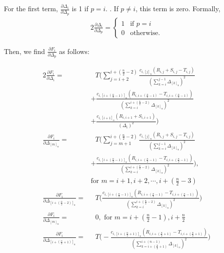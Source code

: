 For the first term, $\frac{\partial\Delta_{i}}{\partial \Delta_p}$ is 1 if $p = i$. . If $p \neq i$, this term is zero. Formally,
\begin{alignat}{2}
\frac{\partial\Delta_{i}}{\partial \Delta_p} = \begin{cases}1 & \text{if }p = i \\ 0 & \text{otherwise.}\end{cases}
\label{eq:diffdelta}
\end{alignat}

Then, we find $\frac{\partial F_i}{\partial \Delta_p}$ as follows:

\begin{alignat}{2}
\frac{\partial F_i}{\partial \Delta_i} =& \text{ }T \Bigg( \sum_{j= i + 2}^{i+(\frac{n}{2}-2)}  \frac{c_{i,[j]_n}(R_{i,j} + S_{i,j} - T_{i,j})}{(\sum_{k=i}^{j-1}\Delta_{[k]_n})^2} \nonumber \\
    &+ \frac{c_{i,[i+(\frac{n}{2}-1)]_n}(R_{i,i+(\frac{n}{2}-1)} - T_{i,i+(\frac{n}{2}-1)})}{(\sum_{k=i}^{i+(\frac{n}{2}-2)}\Delta_{[k]_n})^2} \nonumber \\
    &+ \frac{c_{i,[i+1]_n}(R_{i,i+1} + S_{i,i+1})}{(\Delta_i)^2} \Bigg) \nonumber \\
\frac{\partial F_i}{\partial \Delta_{[m]_n}} =& \text{ }T \Bigg( \sum_{j= m + 1}^{i+(\frac{n}{2}-2)}  \frac{c_{i,[j]_n}(R_{i,j} + S_{i,j} - T_{i,j})}{(\sum_{k=i}^{j-1}\Delta_{[k]_n})^2} \nonumber \\
  &+ \frac{c_{i,[i+(\frac{n}{2}-1)]_n}(R_{i,i+(\frac{n}{2}-1)} - T_{i,i+(\frac{n}{2}-1)})}{(\sum_{k=i}^{i+(\frac{n}{2}-2)}\Delta_{[k]_n})^2} \Bigg), \nonumber \\
   &\text{for } m = i+1, i+2, \cdots, i + (\frac{n}{2} - 3) \nonumber \\
 \frac{\partial F_i}{\partial \Delta_{[i+(\frac{n}{2}-2)]_n}} =& \text{ } T \Bigg( \frac{c_{i,[i+(\frac{n}{2}-1)]_n}(R_{i,i+(\frac{n}{2}-1)} - T_{i,i+(\frac{n}{2}-1)})}{(\sum_{k=i}^{i+(\frac{n}{2}-2)}\Delta_{[k]_n})^2} \Bigg) \nonumber \ \\
\frac{\partial F_i}{\partial \Delta_{[m]_n}} =& \text{ }0, \text{ for } m = i + (\frac{n}{2} - 1), i + \frac{n}{2} \nonumber \\
\frac{\partial F_i}{\partial \Delta_{[i+(\frac{n}{2}+1)]_n}} =& \text{ } T \Bigg( - \frac{c_{i,[i+(\frac{n}{2}+1)]_n}(R_{i,i+(\frac{n}{2}+1)} - T_{i,i+(\frac{n}{2}+1)})}{(\sum_{k=i+(\frac{n}{2}+1)}^{i+(n-1)}\Delta_{[k]_n})^2} \Bigg) \nonumber \\

\end{alignat}
